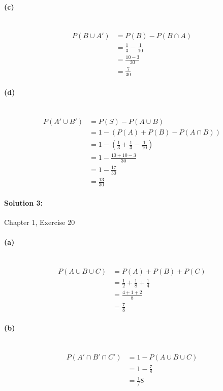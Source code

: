 \documentclass[a4paper]{article}
\begin{document}
\paragraph{(c)} ~\\
\begin{align*} 
P(B \cup A') &= P(B) - P(B \cap A) \\
             &= \frac{1}{3} - \frac{1}{10} \\
             &= \frac{10-3}{30} \\
             &= \frac{7}{30}
\end{align*}

\paragraph{(d)} ~\\
\begin{align*} 
P(A' \cup B') &= P(S) - P(A \cup B) \\
              &= 1 - (P(A) + P(B) - P(A \cap B)) \\
              &= 1 - (\frac{1}{3} + \frac{1}{3} - \frac{1}{10}) \\
              &= 1 - \frac{10+10-3}{30} \\
              &= 1 - \frac{17}{30} \\
              &= \frac{13}{30}
\end{align*}

\paragraph{Solution 3:}
Chapter 1, Exercise 20

\paragraph{(a)} ~\\
\begin{align*} 
P(A \cup B \cup C) &= P(A) + P(B) + P(C) \\
                   &= \frac{1}{2} + \frac{1}{8} + \frac{1}{4} \\
                   &= \frac{4+1+2}{8} \\
                   &= \frac{7}{8}
\end{align*}

\paragraph{(b)} ~\\
\begin{align*} 
P(A' \cap B' \cap C') &= 1 - P(A \cup B \cup C) \\
                      &= 1 - \frac{7}{8} \\
                      &= \frac{1}/{8}
\end{align*}
\end{document}

